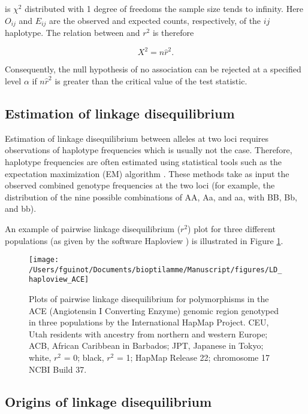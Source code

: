 \documentclass[]{book}
\begin{document}
is \(\chi^2\) distributed with 1 degree of freedoms the sample size tends
to infinity. Here \(O_{ij}\) and \(E_{ij}\) are the observed and expected
counts, respectively, of the \(ij\) haplotype. The relation between and
\(r^2\) is therefore

\[X^2 = n\hat{r}^2.\]

Consequently, the null hypothesis of no association can be rejected at a
specified level \(\alpha\) if \(n\hat{r}^2\) is greater than the critical
value of the test statistic.

\hypertarget{estimation-of-linkage-disequilibrium}{%
\subsection{Estimation of linkage disequilibrium}\label{estimation-of-linkage-disequilibrium}}

Estimation of linkage disequilibrium between alleles at two loci
requires observations of haplotype frequencies which is usually not the
case. Therefore, haplotype frequencies are often estimated using
statistical tools such as the expectation maximization (EM) algorithm
\citep{weir1990genetic}. These methods take as input the observed combined
genotype frequencies at the two loci (for example, the distribution of
the nine possible combinations of AA, Aa, and aa, with BB, Bb, and bb).

An example of pairwise linkage disequilibrium (\(r^2\)) plot for three
different populations (as given by the software Haploview
\citep{barrett2004haploview}) is illustrated in Figure \ref{fig:LDhaploview}.



\begin{figure}

{\centering \texttt{[image: /Users/fguinot/Documents/bioptilamme/Manuscript/figures/LD\_haploview\_ACE]} 

}

\caption{Plots of pairwise linkage disequilibrium for polymorphisms in the ACE (Angiotensin I Converting Enzyme) genomic region genotyped in three populations by the International HapMap Project. CEU, Utah residents with ancestry from northern and western Europe; ACB, African Caribbean in Barbados; JPT, Japanese in Tokyo; white, \(r^2\) = 0; black, \(r^2\) = 1; HapMap Release 22; chromosome 17 NCBI Build 37.}\label{fig:LDhaploview}
\end{figure}

\hypertarget{origins-of-linkage-disequilibrium}{%
\subsection{Origins of linkage disequilibrium}\label{origins-of-linkage-disequilibrium}}
\end{document}
